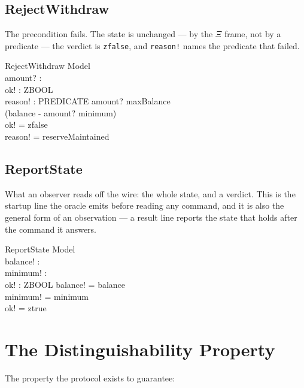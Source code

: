 \documentclass[a4paper,10pt,fleqn]{article}
\begin{document}
\subsection{RejectWithdraw}

The precondition fails. The state is unchanged --- by the $\Xi$ frame,
not by a predicate --- the verdict is \texttt{zfalse}, and
\texttt{reason!} names the predicate that failed.

\begin{schema}{RejectWithdraw}
  \Xi Model \\
  amount? : \nat \\
  ok! : ZBOOL \\
  reason! : PREDICATE
  \where
  amount? \leq maxBalance \\
  \lnot (balance - amount? \geq minimum) \\
  ok! = zfalse \\
  reason! = reserveMaintained
\end{schema}

\subsection{ReportState}

What an observer reads off the wire: the whole state, and a verdict. This
is the startup line the oracle emits before reading any command, and it
is also the general form of an observation --- a result line reports the
state that holds after the command it answers.

\begin{schema}{ReportState}
  \Xi Model \\
  balance! : \nat \\
  minimum! : \nat \\
  ok! : ZBOOL
  \where
  balance! = balance \\
  minimum! = minimum \\
  ok! = ztrue
\end{schema}

\section{The Distinguishability Property}

The property the protocol exists to guarantee:
\end{document}
